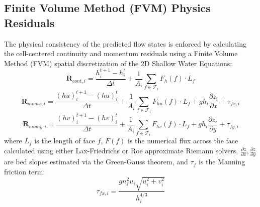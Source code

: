 \documentclass[11pt,a4paper]{article}
\begin{document}
\subsection{Finite Volume Method (FVM) Physics Residuals}
The physical consistency of the predicted flow states is enforced by calculating the cell-centered continuity and momentum residuals using a Finite Volume Method (FVM) spatial discretization of the 2D Shallow Water Equations:
\begin{equation}
\mathbf{R}_{cont, i} = \frac{h^{t+1}_i - h^t_i}{\Delta t} + \frac{1}{A_i} \sum_{f \in \mathcal{F}_i} F_h(f) \cdot L_f
\end{equation}
\begin{equation}
\mathbf{R}_{momx, i} = \frac{(hu)^{t+1}_i - (hu)^t_i}{\Delta t} + \frac{1}{A_i} \sum_{f \in \mathcal{F}_i} F_{hu}(f) \cdot L_f + g h_i \frac{\partial z_i}{\partial x} + \tau_{fx, i}
\end{equation}
\begin{equation}
\mathbf{R}_{momy, i} = \frac{(hv)^{t+1}_i - (hv)^t_i}{\Delta t} + \frac{1}{A_i} \sum_{f \in \mathcal{F}_i} F_{hv}(f) \cdot L_f + g h_i \frac{\partial z_i}{\partial y} + \tau_{fy, i}
\end{equation}
where $L_f$ is the length of face $f$, $F(f)$ is the numerical flux across the face calculated using either Lax-Friedrichs or Roe approximate Riemann solvers, $\frac{\partial z}{\partial x}, \frac{\partial z}{\partial y}$ are bed slopes estimated via the Green-Gauss theorem, and $\tau_f$ is the Manning friction term:
\begin{equation}
\tau_{fx, i} = \frac{g n_i^2 u_i \sqrt{u_i^2 + v_i^2}}{h_i^{4/3}}
\end{equation}
\end{document}
